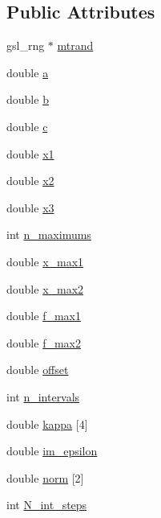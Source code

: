 \subsection*{Public Attributes}
\begin{DoxyCompactItemize}
\item 
gsl\+\_\+rng $\ast$ \hyperlink{classkappa__distribution_a534c1be1b65e324fa62a733b3538196a}{mtrand}
\item 
double \hyperlink{classkappa__distribution_ac85c34598a6c6541660c024f509977c2}{a}
\item 
double \hyperlink{classkappa__distribution_ac9487f58886c93bede8d10f0660df323}{b}
\item 
double \hyperlink{classkappa__distribution_a90698395f61fde53725916a1405c2613}{c}
\item 
double \hyperlink{classkappa__distribution_aaf581ec013e458d9632689422352b575}{x1}
\item 
double \hyperlink{classkappa__distribution_a13e498d40d784837a04374e35d4ff4b7}{x2}
\item 
double \hyperlink{classkappa__distribution_add191b8968caa8c0f56806ab95ab9541}{x3}
\item 
int \hyperlink{classkappa__distribution_a437034eceb23e234b297882e74e65635}{n\+\_\+maximums}
\item 
double \hyperlink{classkappa__distribution_a1b1f2f453758df12ae36c45a2ef1442e}{x\+\_\+max1}
\item 
double \hyperlink{classkappa__distribution_a8ddb60e0b690eba68d3651975e0de470}{x\+\_\+max2}
\item 
double \hyperlink{classkappa__distribution_a4c5660bf0eb745115a97b763c400a2e7}{f\+\_\+max1}
\item 
double \hyperlink{classkappa__distribution_a197a28c1e2fb49e3ab2ba12fbf0b9de3}{f\+\_\+max2}
\item 
double \hyperlink{classkappa__distribution_ac1df2a43af198de04f20db0067754f31}{offset}
\item 
int \hyperlink{classkappa__distribution_a24fa777b043581c42d7b1219509bcef1}{n\+\_\+intervals}
\item 
double \hyperlink{classkappa__distribution_adabd36d6214f535740375a0bdf13f115}{kappa} \mbox{[}4\mbox{]}
\item 
double \hyperlink{classkappa__distribution_a6506e5322c9a9c919af36d9d34dbb180}{im\+\_\+epsilon}
\item 
double \hyperlink{classkappa__distribution_af7d9662cfb3cd567676f36785a3d15a1}{norm} \mbox{[}2\mbox{]}
\item 
int \hyperlink{classkappa__distribution_ab816226e269c7af719438350cebaf4eb}{N\+\_\+int\+\_\+steps}
\end{DoxyCompactItemize}


